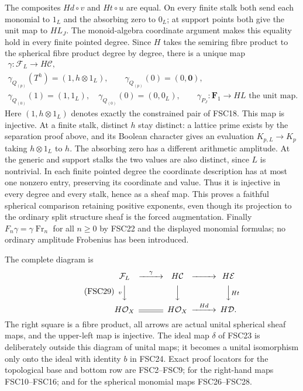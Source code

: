 The composites $Hd\circ v$ and $Ht\circ u$ are equal. On every
finite stalk both send each monomial to $1_L$ and the absorbing zero
to $0_L$; at support points both give the unit map to $HL_J$.
The monoid-algebra coordinate argument makes this equality hold in
every finite pointed degree. Since $H$ takes the semiring fibre product
to the spherical fibre product degree by degree, there is a unique map
\begin{equation}\tag{FSC28}
 \begin{gathered}
 \gamma:\mathcal F_L\longrightarrow H\mathcal C,\\
 \gamma_{Q_{(p)}}(T^h)=(1,h\otimes1_L),\qquad
 \gamma_{Q_{(p)}}(0)=(0,\mathbf0),\\
 \gamma_{Q_{(0)}}(1)=(1,1_L),\quad
 \gamma_{Q_{(0)}}(0)=(0,0_L),\qquad
 \gamma_{P_J}:\mathbf F_1\to HL\text{ the unit map}.
 \end{gathered}
\end{equation}
Here $(1,h\otimes1_L)$ denotes exactly the constrained pair of FSC18.
This map is injective. At a finite stalk, distinct $h$ stay distinct:
a lattice prime exists by the separation proof above, and its Boolean
character gives an evaluation $K_{p,L}\to K_p$ taking
$h\otimes1_L$ to $h$. The absorbing zero has a different arithmetic
amplitude. At the generic and support stalks the two values are
also distinct, since $L$ is nontrivial. In each finite pointed degree
the coordinate description has at most one nonzero entry, preserving
its coordinate and value. Thus it is injective in every degree and
every stalk, hence as a sheaf map. This proves a faithful spherical
comparison retaining positive exponents, even though its projection
to the ordinary split structure sheaf is the forced augmentation.
Finally $F_n\gamma=\gamma\operatorname{Fr}_n$ for all $n\ge0$ by
FSC22 and the displayed monomial formulas; no ordinary amplitude
Frobenius has been introduced.

The complete diagram is
\begin{equation}\tag{FSC29}
\begin{CD}
 \mathcal F_L @>{\gamma}>> H\mathcal C @>>> H\mathcal E\\
 @V{v}VV @VVV @VV{Ht}V\\
 H\mathcal O_X @= H\mathcal O_X @>{Hd}>> H\mathcal D.
\end{CD}
\end{equation}
The right square is a fibre product, all arrows are actual unital
spherical sheaf maps, and the upper-left map is injective. The ideal
map $\delta$ of FSC23 is deliberately outside this diagram of unital
maps; it becomes a unital isomorphism only onto the ideal with identity
$b$ in FSC24. Exact proof locators for the topological base and bottom
row are FSC2--FSC9; for the right-hand maps FSC10--FSC16; and for the
spherical monomial maps FSC26--FSC28.


